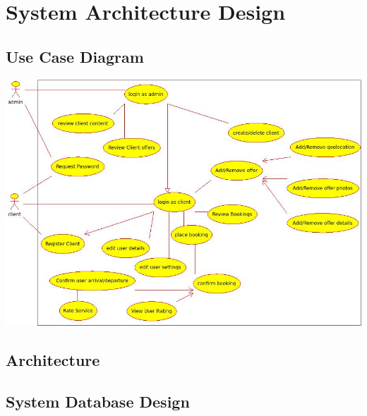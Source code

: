 \chapter*{System Architecture Design}

\section*{Use Case Diagram}
\includegraphics[scale=0.6]{img/use_case_project.jpeg}
\section*{Architecture}
\section*{System Database Design}